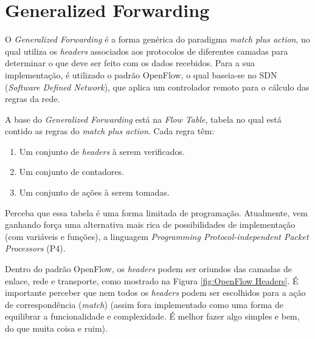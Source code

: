 \hypertarget{generalized-forwarding}{%
\chapter{Generalized Forwarding}\label{generalized-forwarding}}

O \emph{Generalized Forwarding} é a forma genérica do paradigma
\emph{match plus action}, no qual utiliza os \emph{headers} associados
aos protocolos de diferentes camadas para determinar o que deve ser
feito com os dados recebidos. Para a sua implementação, é utilizado o
padrão OpenFlow, o qual baseia-se no SDN (\emph{Software Defined
Network}), que aplica um controlador remoto para o cálculo das regras da
rede.

A base do \emph{Generalized Forwarding} está na \emph{Flow Table},
tabela no qual está contido as regras do \emph{match plus action}. Cada
regra têm:

\begin{enumerate}
\def\labelenumi{\arabic{enumi}.}
\tightlist
\item
  Um conjunto de \emph{headers} à serem verificados.
\item
  Um conjunto de contadores.
\item
  Um conjunto de ações à serem tomadas.
\end{enumerate}

Perceba que essa tabela é uma forma limitada de programação. Atualmente,
vem ganhando força uma alternativa mais rica de possibilidades de
implementação (com variáveis e funções), a linguagem \emph{Programming
Protocol-independent Packet Processors} (P4).

Dentro do padrão OpenFlow, os \emph{headers} podem ser oriundos das
camadas de enlace, rede e transporte, como mostrado na Figura \ref{fig:OpenFlow Headers}. É
importante perceber que nem todos os \emph{headers} podem ser escolhidos
para a ação de correspondência (\emph{match}) (assim fora implementado
como uma forma de equilibrar a funcionalidade e complexidade. É melhor
fazer algo simples e bem, do que muita coisa e ruim).


